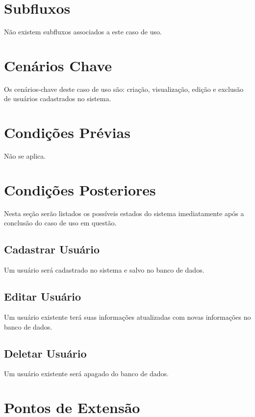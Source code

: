 \documentclass[12pt,a4paper]{article}
\begin{document}
\section{Subfluxos}

Não existem subfluxos associados a este caso de uso.

\section{Cenários Chave}

Os cenários-chave deste caso de uso são: criação, visualização, edição e
exclusão de usuários cadastrados no sistema.

\section{Condições Prévias}

Não se aplica.

\section{Condições Posteriores}

Nesta seção serão listados os possíveis estados do sistema imediatamente após
a conclusão do caso de uso em questão.

\subsection{Cadastrar Usuário}

Um usuário será cadastrado no sistema e salvo no banco de dados.

\subsection{Editar Usuário}

Um usuário existente terá suas informações atualizadas com novas informações
no banco de dados.

\subsection{Deletar Usuário}

Um usuário existente será apagado do banco de dados.

\section{Pontos de Extensão}
\end{document}
